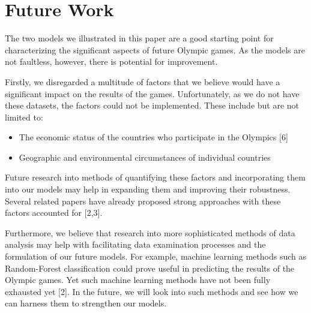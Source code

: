 \documentclass{mcmthesis}
\begin{document}
\section{Future Work}
The two models we illustrated in this paper are a good starting point for characterizing the significant aspects of future Olympic games. As the models are not faultless, however, there is potential for improvement. \par
Firstly, we disregarded a multitude of factors that we believe would have a significant impact on the results of the games. Unfortunately, as we do not have these datasets, the factors could not be implemented. These include but are not limited to:
\begin{itemize}
    \item The economic status of the countries who participate in the Olympics [6]
    \item Geographic and environmental circumstances of individual countries 
\end{itemize} \par
Future research into methods of quantifying these factors and incorporating them into our models may help in expanding them and improving their robustness. Several related papers have already proposed strong approaches with these factors accounted for [2,3]. \par
Furthermore, we believe that research into more sophisticated methods of data analysis may help with facilitating data examination processes and the formulation of our future models. For example, machine learning methods such as Random-Forest classification could prove useful in predicting the results of the Olympic games. Yet such machine learning methods have not been fully exhausted yet [2]. In the future, we will look into such methods and see how we can harness them to strengthen our models. 
\end{document}
